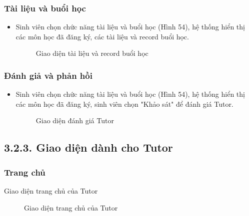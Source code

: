 \subsubsection*{Tài liệu và buổi học}
\begin{itemize}
    \item Sinh viên chọn chức năng tài liệu và buổi học (Hình 54), hệ thống hiển thị các môn học đã đăng ký, các tài liệu và record buổi học. 
    \begin{figure}[H]
    \centering
    \setlength{\fboxsep}{2pt}     
    \setlength{\fboxrule}{0.5pt}   
    \caption{Giao diện tài liệu và record buổi học}
    \end{figure}
\end{itemize}

\subsubsection*{Đánh giả và phản hồi}
\begin{itemize}
    \item Sinh viên chọn chức năng tài liệu và buổi học (Hình 54), hệ thống hiển thị các môn học đã đăng ký, sinh viên chọn "Khảo sát" để đánh giá Tutor. 
    \begin{figure}[H]
    \centering
    \setlength{\fboxsep}{2pt}     
    \setlength{\fboxrule}{0.5pt}   
    \caption{Giao diện đánh giá Tutor}
    \end{figure}
\end{itemize}

\subsection*{3.2.3. Giao diện dành cho Tutor}

\subsubsection*{Trang chủ}
Giao diện trang chủ của Tutor
\begin{figure}[H]
    \centering
    \setlength{\fboxsep}{2pt}     
    \setlength{\fboxrule}{0.5pt}   
    \caption{Giao diện trang chủ của Tutor}
\end{figure}